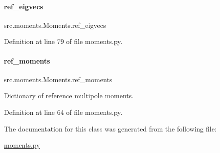 \mbox{\label{classsrc_1_1moments_1_1Moments_aade44568e6eff2bc201eb75dc0b9f188}} 
\paragraph{\texorpdfstring{ref\+\_\+eigvecs}{ref\_eigvecs}}
{\footnotesize\ttfamily src.\+moments.\+Moments.\+ref\+\_\+eigvecs}



Definition at line 79 of file moments.\+py.

\mbox{\label{classsrc_1_1moments_1_1Moments_a5df511eabdedb11fb6302bfb6efe0332}} 
\paragraph{\texorpdfstring{ref\+\_\+moments}{ref\_moments}}
{\footnotesize\ttfamily src.\+moments.\+Moments.\+ref\+\_\+moments}



Dictionary of reference multipole moments. 



Definition at line 64 of file moments.\+py.



The documentation for this class was generated from the following file\+:\begin{DoxyCompactItemize}
\item 
\hyperlink{moments_8py}{moments.\+py}\end{DoxyCompactItemize}
